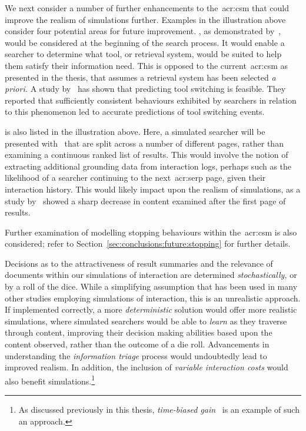 We next consider a number of further enhancements to the~\gls{acr:csm} that could improve the realism of simulations further. Examples in the illustration above consider four potential areas for future improvement. , as demonstrated by~\cite{thomas2014modelling_behaviour}, would be considered at the beginning of the search process. It would enable a searcher to determine what tool, or retrieval system, would be suited to help them satisfy their information need. This is opposed to the current~\gls{acr:csm} as presented in the thesis, that assumes a retrieval system has been selected \emph{a priori.} A study by~\cite{white2009tool_switching} has shown that predicting tool switching is feasible. They reported that sufficiently consistent behaviours exhibited by searchers in relation to this phenomenon led to accurate predictions of tool switching events.

 is also listed in the illustration above. Here, a simulated searcher will be presented with~ that are split across a number of different pages, rather than examining a continuous ranked list of results. This would involve the notion of extracting additional grounding data from interaction logs, perhaps such as the likelihood of a searcher continuing to the next~\gls{acr:serp} page, given their interaction history. This would likely impact upon the realism of simulations, as a study by~\cite{jansen2005analysis} showed a sharp decrease in content examined after the first page of results.

Further examination of modelling stopping behaviours within the~\gls{acr:csm} is also considered; refer to Section~\ref{sec:conclusions:future:stopping} for further details.

 Decisions as to the attractiveness of result summaries and the relevance of documents within our simulations of interaction are determined \emph{stochastically,} or by a roll of the dice. While a simplifying assumption that has been used in many other studies employing simulations of interaction, this is an unrealistic approach. If implemented correctly, a more \emph{deterministic} solution would offer more realistic simulations, where simulated searchers would be able to \emph{learn} as they traverse through content, improving their decision making abilities based upon the content observed, rather than the outcome of a die roll. Advancements in understanding the \emph{information triage} process would undoubtedly lead to improved realism. In addition, the inclusion of \emph{variable interaction costs} would also benefit simulations.\footnote{As discussed previously in this thesis, \emph{time-biased gain}~\citep{smucker2012tbg} is an example of such an approach.}

